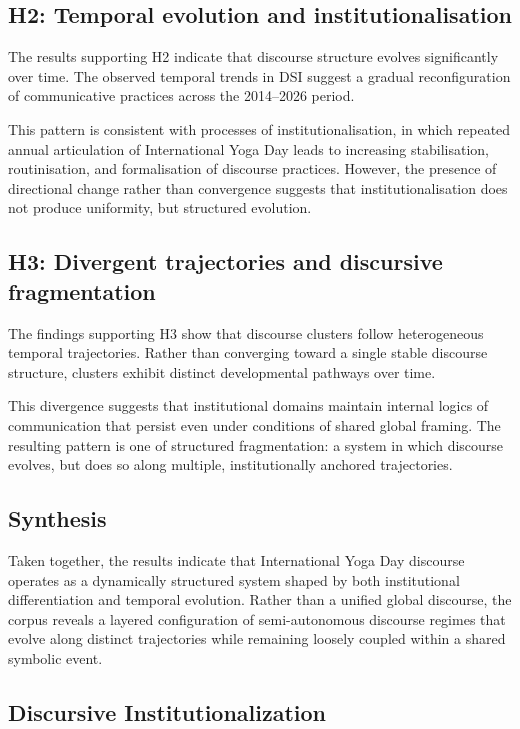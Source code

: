 \documentclass[11pt]{article}
\begin{document}
\subsection{H2: Temporal evolution and institutionalisation}

The results supporting H2 indicate that discourse structure evolves significantly over time. 
The observed temporal trends in DSI suggest a gradual reconfiguration of communicative 
practices across the 2014–2026 period.

This pattern is consistent with processes of institutionalisation, in which repeated annual 
articulation of International Yoga Day leads to increasing stabilisation, routinisation, 
and formalisation of discourse practices. However, the presence of directional change rather 
than convergence suggests that institutionalisation does not produce uniformity, but structured evolution.

\subsection{H3: Divergent trajectories and discursive fragmentation}

The findings supporting H3 show that discourse clusters follow heterogeneous temporal trajectories. 
Rather than converging toward a single stable discourse structure, clusters exhibit distinct developmental 
pathways over time.

This divergence suggests that institutional domains maintain internal logics of communication that persist 
even under conditions of shared global framing. The resulting pattern is one of structured fragmentation: 
a system in which discourse evolves, but does so along multiple, institutionally anchored trajectories.

\subsection{Synthesis}

Taken together, the results indicate that International Yoga Day discourse operates as a dynamically 
structured system shaped by both institutional differentiation and temporal evolution. Rather than a 
unified global discourse, the corpus reveals a layered configuration of semi-autonomous discourse 
regimes that evolve along distinct trajectories while remaining loosely coupled within a shared symbolic event.


\subsection{Discursive Institutionalization}
\end{document}
